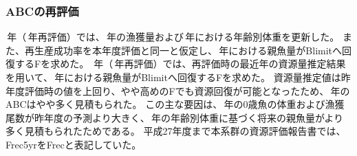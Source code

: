 \subsubsection{ABCの再評価}
{\LastYr}\,年（{\ThisYr}\,年再評価）では、\makeatletter{}\makeatother\,年の漁獲量および{\LastYr}\,年における年齢別体重を更新した。
また、再生産成功率を本年度評価と同一と仮定し、\makeatletter{}\makeatother\,年における親魚量がBlimitへ回復するFを求めた。
{\ThisYr}\,年（{\ThisYr}\,年再評価）では、再評価時の最近年の資源量推定結果を用いて、\makeatletter{}\makeatother\,年における親魚量がBlimitへ回復するFを求めた。
資源量推定値は昨年度評価時の値を上回り、やや高めのFでも資源回復が可能となったため、{\ThisYr}\,年のABCはやや多く見積もられた。
この主な要因は、{\LastYr}\,年の0歳魚の体重および漁獲尾数が昨年度の予測より大きく、{\LastYr}\,年の年齢別体重に基づく将来の親魚量がより多く見積もられたためである。
平成27年度まで本系群の資源評価報告書では、Frec5yrをFrecと表記していた。

